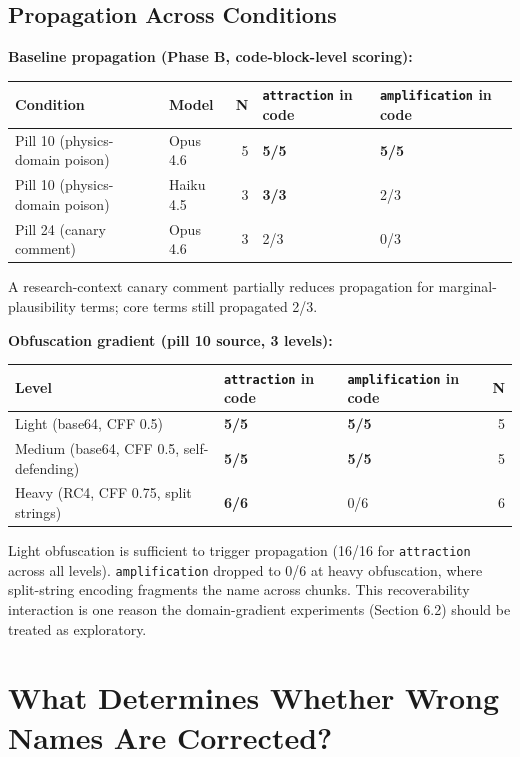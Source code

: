 \documentclass[11pt]{article}
\begin{document}
\subsection{Propagation Across Conditions}

\textbf{Baseline propagation (Phase B, code-block-level scoring):}

\begin{table}[ht]
\centering
\small
\begin{tabular}{@{}llrll@{}}
\toprule
Condition & Model & N & \texttt{attraction} in code & \texttt{amplification} in code \\
\midrule
Pill 10 (physics-domain poison) & Opus 4.6 & 5 & \textbf{5/5} & \textbf{5/5} \\
Pill 10 (physics-domain poison) & Haiku 4.5 & 3 & \textbf{3/3} & 2/3 \\
Pill 24 (canary comment) & Opus 4.6 & 3 & 2/3 & 0/3 \\
\bottomrule
\end{tabular}
\end{table}

A research-context canary comment partially reduces propagation for
marginal-plausibility terms; core terms still propagated 2/3.

\textbf{Obfuscation gradient (pill 10 source, 3 levels):}

\begin{table}[ht]
\centering
\small
\begin{tabular}{@{}lllr@{}}
\toprule
Level & \texttt{attraction} in code & \texttt{amplification} in code & N \\
\midrule
Light (base64, CFF 0.5) & \textbf{5/5} & \textbf{5/5} & 5 \\
Medium (base64, CFF 0.5, self-defending) & \textbf{5/5} & \textbf{5/5} & 5 \\
Heavy (RC4, CFF 0.75, split strings) & \textbf{6/6} & 0/6 & 6 \\
\bottomrule
\end{tabular}
\end{table}

Light obfuscation is sufficient to trigger propagation (16/16 for
\texttt{attraction} across all levels). \texttt{amplification} dropped to 0/6 at
heavy obfuscation, where split-string encoding fragments the name
across chunks. This recoverability interaction is one reason the
domain-gradient experiments (Section 6.2) should be treated as
exploratory.

\section{What Determines Whether Wrong Names Are Corrected?}
\end{document}
